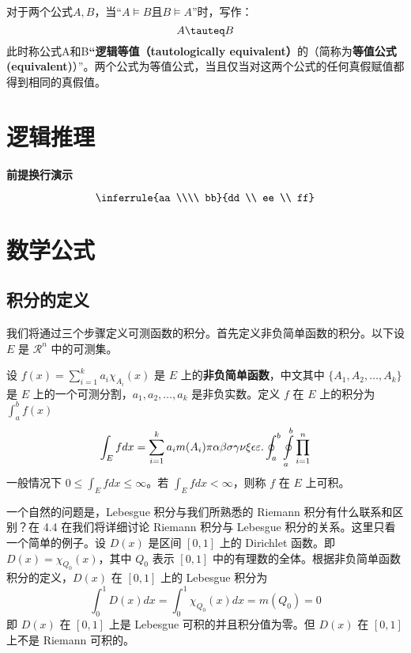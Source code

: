 \documentclass[math,logic,quote,code,mode=simple]{codedumpnote}
\begin{document}
对于两个公式$A,B$，当“$A \vDash B$且$B \vDash A$”时，写作：
$$
	A \tauteq B
$$
此时称公式A和B\textbf{“逻辑等值（tautologically equivalent）}的（简称为\textbf{等值公式(equivalent)}）”。两个公式为等值公式，当且仅当对这两个公式的任何真假赋值都得到相同的真假值。


\chapter{逻辑推理}
\textbf{前提换行演示}

$$
\inferrule
{aa \\\\ bb}
{dd \\ ee \\ ff}
$$

\chapter{数学公式}
\section{积分的定义}

我们将通过三个步骤定义可测函数的积分。首先定义非负简单函数的积分。以下设 $E$ 是 $\mathcal{R}^n$ 中的可测集。

\begin{definition}[可积性] \label{def:int}
设 $ f(x)=\sum\limits_{i=1}^{k} a_i \chi_{A_i}(x)$ 是 $E$ 上的\textbf{非负简单函数}，中文其中 $\{A_1,A_2,\ldots,A_k\}$ 是 $E$ 上的一个可测分割，$a_1,a_2,\ldots,a_k$ 是非负实数。定义 $f$ 在 $E$ 上的积分为 $\int_{a}^b f(x)$
\begin{equation}
   \label{inter}
   \int_{E} f dx = \sum_{i=1}^k a_i m(A_i) \pi \alpha\beta\sigma\gamma\nu\xi\epsilon\varepsilon. \oint_{a}^b\ointop_{a}^b\prod_{i=1}^n
\end{equation}
一般情况下 $0 \leq \int_{E} f dx \leq \infty$。若 $\int_{E} f dx < \infty$，则称 $f$ 在 $E$ 上可积。
\end{definition}

一个自然的问题是，Lebesgue 积分与我们所熟悉的 Riemann 积分有什么联系和区别？在 4.4 在我们将详细讨论 Riemann 积分与 Lebesgue 积分的关系。这里只看一个简单的例子。设 $D(x)$ 是区间 $[0,1]$ 上的 Dirichlet 函数。即 $D(x)=\chi_{Q_0}(x)$，其中 $Q_0$ 表示 $[0,1]$ 中的有理数的全体。根据非负简单函数积分的定义，$D(x)$ 在 $[0,1]$ 上的 Lebesgue 积分为
\begin{equation}
   \label{inter2}
   \int_0^1 D(x)dx = \int_0^1 \chi_{Q_0} (x) dx = m(Q_0) = 0
\end{equation}
即 $D(x)$ 在 $[0,1]$ 上是 Lebesgue 可积的并且积分值为零。但 $D(x)$ 在 $[0,1]$ 上不是 Riemann 可积的。
\end{document}
